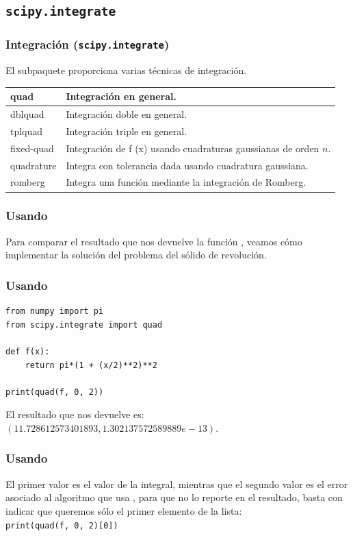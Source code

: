 \documentclass[12pt]{beamer}
\begin{document}
\subsection{\texttt{scipy.integrate}}

\begin{frame}
\frametitle{Integración (\texttt{scipy.integrate})}
El subpaquete  proporciona varias técnicas de integración.
\pause
\fontsize{12}{12}\selectfont
\begin{table}
\renewcommand{\arraystretch}{0.9}
\begin{tabular}{l | p{8cm}}
quad 		& Integración en general. \\ \hline
dblquad 	& Integración doble en general. \\ \hline
tplquad 	& Integración triple en general. \\ \hline
fixed-quad 	& Integración de f (x) usando cuadraturas gaussianas de orden $n$. \\ \hline
quadrature 	& Integra con tolerancia dada usando cuadratura gaussiana. \\ \hline
romberg 	& Integra una función mediante la integración de Romberg.
\end{tabular}
\end{table}
\end{frame}
\begin{frame}[fragile]
\frametitle{Usando }
Para comparar el resultado que nos devuelve la función , veamos cómo implementar la solución del problema del sólido de revolución.
\end{frame}
\begin{frame}[fragile]
\frametitle{Usando }
\begin{lstlisting}[caption=Integración con scipy]
from numpy import pi
from scipy.integrate import quad

def f(x):
    return pi*(1 + (x/2)**2)**2
   
print(quad(f, 0, 2))
\end{lstlisting}
\pause
El resultado que nos devuelve es: $(11.728612573401893, 1.302137572589889e-13)$.
\end{frame}
\begin{frame}[fragile]
\frametitle{Usando }
El \textcolor{burntumber}{primer valor es el valor de la integral}, mientras que el \textcolor{carnelian}{segundo valor es el error} asociado al algoritmo que usa , para que no lo reporte en el resultado, basta con indicar que queremos sólo el primer elemento de la lista:
\\
\bigskip
\pause
\verb|print(quad(f, 0, 2)[0])|
\end{frame}
\end{document}
